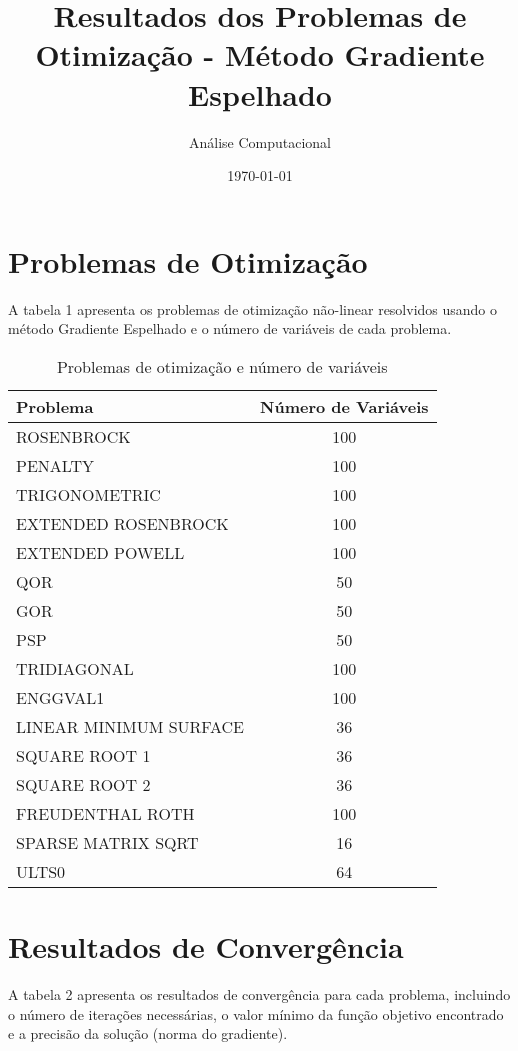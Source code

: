 \documentclass[12pt]{article}
\title{Resultados dos Problemas de Otimização - Método Gradiente Espelhado}
\author{Análise Computacional}
\date{\today}
\begin{document}
\maketitle

\section{Problemas de Otimização}

A tabela 1 apresenta os problemas de otimização não-linear resolvidos usando o método Gradiente Espelhado e o número de variáveis de cada problema.

\begin{table}[h!]
\centering
\caption{Problemas de otimização e número de variáveis}
\label{tab:problemas_variáveis}
\begin{tabular}{@{}|lc|@{}}
\toprule
\textbf{Problema} & \textbf{Número de Variáveis} \\
\midrule
ROSENBROCK & 100 \\
PENALTY & 100 \\
TRIGONOMETRIC & 100 \\
EXTENDED ROSENBROCK & 100 \\
EXTENDED POWELL & 100 \\
QOR & 50 \\
GOR & 50 \\
PSP & 50 \\
TRIDIAGONAL & 100 \\
ENGGVAL1 & 100 \\
LINEAR MINIMUM SURFACE & 36 \\
SQUARE ROOT 1 & 36 \\
SQUARE ROOT 2 & 36 \\
FREUDENTHAL ROTH & 100 \\
SPARSE MATRIX SQRT & 16 \\
ULTS0 & 64 \\
\bottomrule
\end{tabular}
\end{table}

\section{Resultados de Convergência}

A tabela 2 apresenta os resultados de convergência para cada problema, incluindo o número de iterações necessárias, o valor mínimo da função objetivo encontrado e a precisão da solução (norma do gradiente).
\end{document}

